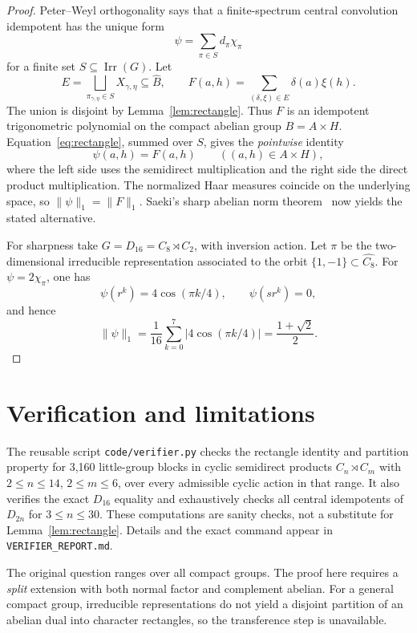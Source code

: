 \documentclass[11pt]{article}
\newcommand{\Irr}{\operatorname{Irr}}
\newcommand{\1}{\mathbf 1}
\newcommand{\norm}[1]{\lVert #1\rVert}
\begin{document}
\begin{proof}
Peter--Weyl orthogonality says that a finite-spectrum central convolution
idempotent has the unique form
\[
 \psi=\sum_{\pi\in S}d_\pi\chi_\pi
\]
for a finite set $S\subseteq\Irr(G)$.  Let
\[
 E=\bigsqcup_{\pi_{\gamma,\eta}\in S}X_{\gamma,\eta}
 \subseteq\widehat B,
 \qquad
 F(a,h)=\sum_{(\delta,\xi)\in E}\delta(a)\xi(h).
\]
The union is disjoint by Lemma~\ref{lem:rectangle}.  Thus $F$ is an idempotent
trigonometric polynomial on the compact abelian group $B=A\times H$.
Equation~\eqref{eq:rectangle}, summed over $S$, gives the \emph{pointwise} identity
\[
 \psi(a,h)=F(a,h)\qquad((a,h)\in A\times H),
\]
where the left side uses the semidirect multiplication and the right side the direct
product multiplication.  The normalized Haar measures coincide on the underlying
space, so $\norm\psi_1=\norm F_1$.  Saeki's sharp abelian norm theorem~\cite{Saeki}
now yields the stated alternative.

For sharpness take $G=D_{16}=C_8\rtimes C_2$, with inversion action.  Let $\pi$ be
the two-dimensional irreducible representation associated to the orbit
$\{1,-1\}\subset\widehat{C_8}$.  For $\psi=2\chi_\pi$, one has
\[
 \psi(r^k)=4\cos(\pi k/4),\qquad \psi(sr^k)=0,
\]
and hence
\[
 \norm\psi_1
 =\frac1{16}\sum_{k=0}^{7}\left|4\cos(\pi k/4)\right|
 =\frac{1+\sqrt2}{2}.
\]
\end{proof}

\section{Verification and limitations}

The reusable script \texttt{code/verifier.py} checks the rectangle identity and
partition property for 3,160 little-group blocks in cyclic semidirect products
$C_n\rtimes C_m$ with $2\le n\le14$, $2\le m\le6$, over every admissible cyclic
action in that range.  It also verifies the exact $D_{16}$ equality and exhaustively
checks all central idempotents of $D_{2n}$ for $3\le n\le30$.  These computations are
sanity checks, not a substitute for Lemma~\ref{lem:rectangle}.  Details and the exact
command appear in \texttt{VERIFIER\_REPORT.md}.

The original question ranges over all compact groups.  The proof here requires a
\emph{split} extension with both normal factor and complement abelian.  For a general
compact group, irreducible representations do not yield a disjoint partition of an
abelian dual into character rectangles, so the transference step is unavailable.
\end{document}
